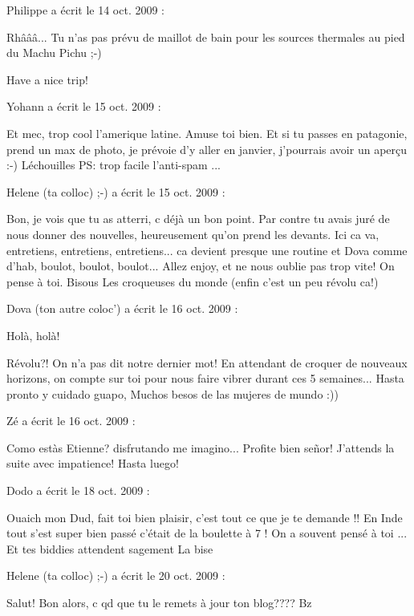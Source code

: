 \medskip
Philippe a écrit le 14 oct. 2009 :
\begin{displayquote}
Rhâââ... Tu n'as pas prévu de maillot de bain pour les sources thermales au pied du Machu Pichu ;-)

Have a nice trip!
\end{displayquote}

\medskip
Yohann a écrit le 15 oct. 2009 :
\begin{displayquote}
Et mec, trop cool l'amerique latine. Amuse toi bien. Et si tu passes en patagonie, prend un max de photo, je prévoie d'y aller en janvier, j'pourrais avoir un aperçu :-)
Léchouilles
PS: trop facile l'anti-spam ...
\end{displayquote}

\medskip
Helene (ta colloc) ;-) a écrit le 15 oct. 2009 :
\begin{displayquote}
Bon, je vois que tu as atterri, c déjà un bon point.
Par contre tu avais juré de nous donner des nouvelles, heureusement qu'on prend les devants.
Ici ca va, entretiens, entretiens, entretiens... ca devient presque une routine et Dova comme d'hab, boulot, boulot, boulot...
Allez enjoy, et ne nous oublie pas trop vite!
On pense à toi.
Bisous
Les croqueuses du monde (enfin c'est un peu révolu ca!)
\end{displayquote}

\medskip
Dova (ton autre coloc') a écrit le 16 oct. 2009 :
\begin{displayquote}
Holà, holà!

Révolu?! On n'a pas dit notre dernier mot!
En attendant de croquer de nouveaux horizons, on compte sur toi pour nous faire vibrer durant ces 5 semaines...
Hasta pronto y cuidado guapo,
Muchos besos de las mujeres de mundo :))
\end{displayquote}

\medskip
Zé a écrit le 16 oct. 2009 :
\begin{displayquote}
Como estàs Etienne? disfrutando me imagino...
Profite bien señor! J'attends la suite avec impatience!
Hasta luego!
\end{displayquote}

\medskip
Dodo a écrit le 18 oct. 2009 :
\begin{displayquote}
Ouaich mon Dud, fait toi bien plaisir, c'est tout ce que je te demande !! En Inde tout s'est super bien passé c'était de la boulette à 7 ! On a souvent pensé à toi ... Et tes biddies attendent sagement
La bise
\end{displayquote}

\medskip
Helene (ta colloc) ;-) a écrit le 20 oct. 2009 :
\begin{displayquote}
Salut!
Bon alors, c qd que tu le remets à jour ton blog????
Bz
\end{displayquote}

\vfill
